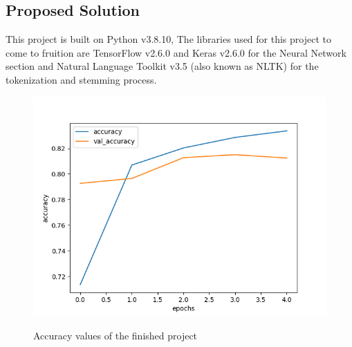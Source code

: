 \documentclass[a4]{sciposter}
\begin{document}
\begin{multicols}{3}
\section{Proposed Solution}
This project is built on Python v3.8.10, The libraries used for this project to come to fruition are TensorFlow v2.6.0 and Keras v2.6.0 for the Neural Network section and Natural Language Toolkit v3.5 (also known as NLTK) for the tokenization and stemming process.
\begin{figure}[!h]
	\centering
	\includegraphics[scale=1]{Accuracy_Exp9}
	\label{fig:AccExp9}
	\captionsetup{type=figure}
	\setcounter{figure}{1}
	\caption{Accuracy values of the finished project}
\end{figure}



\end{multicols}
\end{document}
